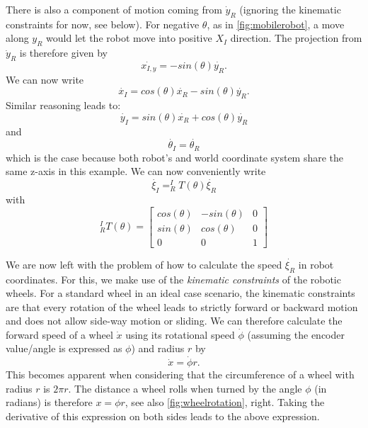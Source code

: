 There is also a component of motion coming from $ \dot{y}_R$ (ignoring the kinematic constraints for now, see below).  For negative $ \theta$, as in \cref{fig:mobilerobot}, a move along $y_R$ would let the robot move into positive $ X_I$ direction. The projection from $ \dot{y}_R$ is therefore given by
\begin{equation}
\dot{x_{I,y}}=-sin(\theta)\dot{y_R}.
\end{equation}
We can now write
\begin{equation}
\dot{x_I}=cos(\theta) \dot{x_R} - sin(\theta) \dot{y_R}.
\end{equation}
Similar reasoning leads to:
\begin{equation}
\dot{y_I}=sin(\theta) \dot{x_R} + cos(\theta) \dot{y_R}
\end{equation}
and
\begin{equation}
\dot{\theta_I}=\dot{\theta_R}
\end{equation}
which is the case because both robot's and world coordinate system share the same z-axis in this example. We can now conveniently write
\begin{equation}
\dot{\xi_I}=^I_RT(\theta)\dot{\xi_R}
\end{equation}
with
\begin{equation}
^I_RT(\theta)=\left[\begin{array}{ccc}
cos(\theta) & -sin(\theta) & 0 \\
sin(\theta) & cos(\theta) & 0 \\
0 & 0 & 1\end{array}\right]
\end{equation}

We are now left with the problem of how to calculate the speed $ \dot{\xi_R}$ in robot coordinates. For this, we make use of the \textsl{kinematic constraints} of the robotic wheels.
For a standard wheel in an ideal case scenario, the kinematic constraints are that every rotation of the wheel leads to strictly forward or backward motion and does not allow side-way motion or sliding. We can therefore calculate the forward speed of a wheel $ \dot{x}$ using its rotational speed $ \dot{\phi}$ (assuming the encoder value/angle is expressed as $ \phi$) and radius $ r$ by
\begin{equation}
\dot{x}=\dot{\phi}r.
\end{equation}
This becomes apparent when considering that the circumference of a wheel with radius $r$ is $2\pi r$. The distance a wheel rolls when turned by the angle $ \phi$ (in radians) is therefore $ x=\phi r$, see also \cref{fig:wheelrotation}, right. Taking the derivative of this expression on both sides leads to the above expression.

